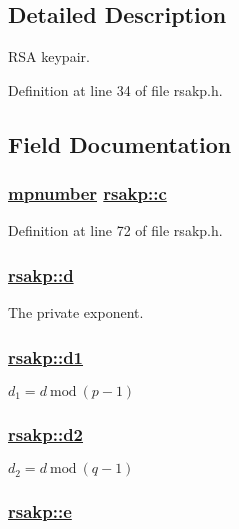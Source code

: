 \subsection{Detailed Description}
RSA keypair. 

Definition at line 34 of file rsakp.h.

\subsection{Field Documentation}
\hypertarget{structrsakp_o7}{
\subsubsection[c]{\setlength{\rightskip}{0pt plus 5cm}\hyperlink{structmpnumber}{mpnumber} \hyperlink{structrsakp_o7}{rsakp::c}}}
\label{structrsakp_o7}


Definition at line 72 of file rsakp.h.\hypertarget{structrsakp_o2}{
\subsubsection[d]{\setlength{\rightskip}{0pt plus 5cm}\hyperlink{structrsakp_o2}{rsakp::d}}}
\label{structrsakp_o2}


The private exponent. 

\hypertarget{structrsakp_o5}{
\subsubsection[d1]{\setlength{\rightskip}{0pt plus 5cm}\hyperlink{structrsakp_o5}{rsakp::d1}}}
\label{structrsakp_o5}


$d_1=d\ \textrm{mod}\ (p-1)$ \hypertarget{structrsakp_o6}{
\subsubsection[d2]{\setlength{\rightskip}{0pt plus 5cm}\hyperlink{structrsakp_o6}{rsakp::d2}}}
\label{structrsakp_o6}


$d_2=d\ \textrm{mod}\ (q-1)$ \hypertarget{structrsakp_o1}{
\subsubsection[e]{\setlength{\rightskip}{0pt plus 5cm}\hyperlink{structrsakp_o1}{rsakp::e}}}
\label{structrsakp_o1}


